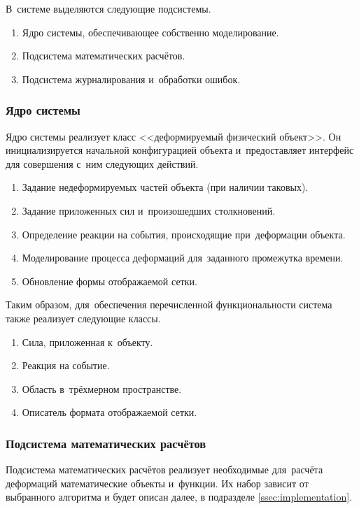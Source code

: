 \documentclass[a4paper, 14pt, titlepage]{extarticle}
\begin{document}
      В~системе выделяются следующие подсистемы.
      \begin{enumerate}
        \item Ядро системы, обеспечивающее собственно моделирование.
        \item Подсистема математических расчётов.
        \item Подсистема журналирования и~обработки ошибок.
      \end{enumerate}

      \subsubsection{Ядро системы}\label{sssec:core}

        Ядро системы реализует класс <<деформируемый физический объект>>. Он инициализируется
        начальной конфигурацией объекта и~предоставляет интерфейс для совершения с~ним следующих действий.
        \begin{enumerate}
          \item Задание недеформируемых частей объекта (при наличии таковых).
          \item Задание приложенных сил и~произошедших столкновений.
          \item Определение реакции на события, происходящие при~деформации объекта.
          \item Моделирование процесса деформаций для~заданного промежутка времени.
          \item Обновление формы отображаемой сетки.
        \end{enumerate}

        Таким образом, для~обеспечения перечисленной функциональности система также реализует следующие классы.
        \begin{enumerate}
          \item Сила, приложенная к~объекту.
          \item Реакция на событие.
          \item Область в~трёхмерном пространстве.
          \item Описатель формата отображаемой сетки.
        \end{enumerate}

      \subsubsection{Подсистема математических расчётов}

        Подсистема математических расчётов реализует необходимые для~расчёта деформаций математические объекты
        и~функции. Их набор зависит от выбранного алгоритма и будет описан далее, в подразделе \ref{ssec:implementation}.
\end{document}
